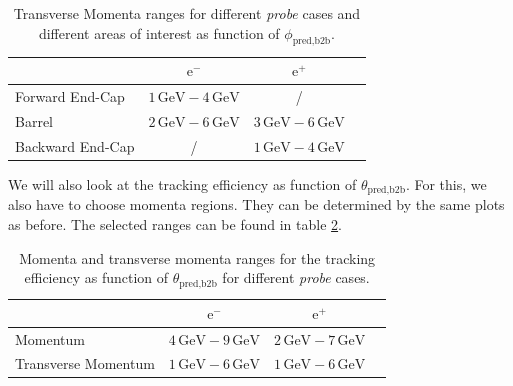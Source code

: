 \documentclass[a4paper,11pt,twosided,final,german,openbib,pdftex,listof=totoc,bibliography=totoc]{scrbook}
\begin{document}
\begin{table}[h!]
	\centering
	\begin{tabular}{lccc}
		&$\textrm{e}^-$ &$\textrm{e}^+$\\
		\hline
		Forward End-Cap &$1\,\textrm{GeV} - 4\,\textrm{GeV}$&/\\
		Barrel &$2\,\textrm{GeV} - 6\,\textrm{GeV}$&$3\,\textrm{GeV} - 6\,\textrm{GeV}$\\
		Backward End-Cap & /&$1\,\textrm{GeV} - 4\,\textrm{GeV}$\\
	\end{tabular}
	
	\caption[Areas Of Interest Different Transverse Momenta Ranges For Tracking Efficiency As Function Of $\phi_{\textrm{pred,b2b}}$]{Transverse Momenta ranges for different \textit{probe} cases and different areas of interest as function of $\phi_{\textrm{pred,b2b}}$.}
	\label{tab:RTPtMDTable}
\end{table}

We will also look at the tracking efficiency as function of $\theta_{\textrm{pred,b2b}}$. For this, we also have to choose momenta regions. They can be determined by the same plots as before.
The selected ranges can be found in table \ref{tab:RTPMDThetaTable}.

\begin{table}[h!]
	\centering
	\begin{tabular}{lccc}
		&$\textrm{e}^-$ &$\textrm{e}^+$\\
		\hline
		Momentum &$4\,\textrm{GeV} - 9\,\textrm{GeV}$&$2\,\textrm{GeV} - 7\,\textrm{GeV}$\\
		Transverse Momentum &$1\,\textrm{GeV} - 6\,\textrm{GeV}$&$1\,\textrm{GeV} - 6\,\textrm{GeV}$\\

	\end{tabular}
	
	\caption[Different (Transverse-) Momenta Ranges For Tracking Efficiency As Function Of $\theta_{\textrm{pred,b2b}}$]{Momenta and transverse momenta ranges for the tracking efficiency as function of $\theta_{\textrm{pred,b2b}}$ for different \textit{probe} cases.}
	\label{tab:RTPMDThetaTable}
\end{table}
\end{document}
